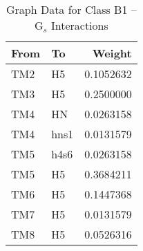 \begin{table}[!h]

\caption{\label{tab:unnamed-chunk-3}Graph Data for Class B1 – G$_{s}$ Interactions}
\centering
\begin{tabular}{llr}
\toprule
From & To & Weight\\
\midrule
TM2 & H5 & 0.1052632\\
TM3 & H5 & 0.2500000\\
TM4 & HN & 0.0263158\\
TM4 & hns1 & 0.0131579\\
TM5 & h4s6 & 0.0263158\\
\addlinespace
TM5 & H5 & 0.3684211\\
TM6 & H5 & 0.1447368\\
TM7 & H5 & 0.0131579\\
TM8 & H5 & 0.0526316\\
\bottomrule
\end{tabular}
\end{table}
